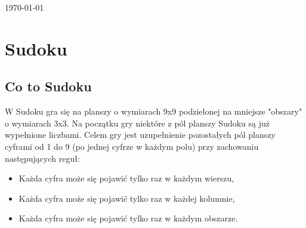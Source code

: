 \documentclass[a4paper, 11pt]{article}
\begin{document}
\begin{titlepage}
		
		
		{\large \today}\\[3cm] %
		
		
		
		
		\vfill %
		
	\end{titlepage}
	
	\newpage
	
	\tableofcontents
	\newpage
	
	\listoffigures
	\newpage
	
	
	
	
	\section{Sudoku}
	\subsection{Co to Sudoku}
W Sudoku gra się na planszy o wymiarach 9x9 podzielonej na mniejsze "obszary" o wymiarach 3x3.  Na początku gry niektóre z pól planszy Sudoku są już wypełnione liczbami.  Celem gry jest uzupełnienie pozostałych pól planszy cyframi od 1 do 9 (po jednej cyfrze w każdym polu) przy zachowaniu następujących reguł:
\begin{itemize}
\item Każda cyfra może się pojawić tylko raz w każdym wierszu,
\item Każda cyfra może się pojawić tylko raz w każdej kolumnie,
\item Każda cyfra może się pojawić tylko raz w każdym obszarze.
\end{itemize}
\end{document}
